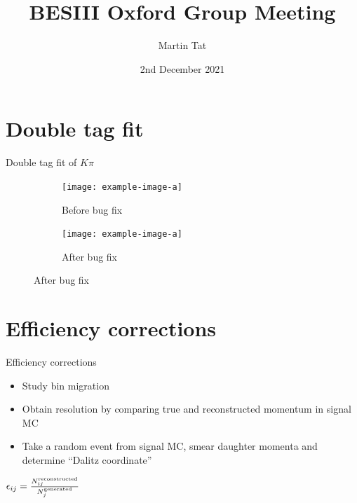\documentclass{beamer}
\title[BESIII Oxford]{BESIII Oxford Group Meeting}
\author{Martin Tat}
\institute{Oxford LHCb}
\date{2nd December 2021}
\begin{document}
\begin{frame}
  \titlepage
\end{frame}


\section{Double tag fit}

\begin{frame}{Double tag fit of $K\pi$}
  \begin{figure}
    \centering
    \begin{subfigure}{0.38\textwidth}
      \centering
      \texttt{[image: example-image-a]}
      \caption{Before bug fix}
    \end{subfigure}%
    \begin{subfigure}{0.38\textwidth}
      \centering
      \texttt{[image: example-image-a]}
      \caption{After bug fix}
    \end{subfigure}
  \end{figure}
\end{frame}

\section{Efficiency corrections}
\begin{frame}{Efficiency corrections}
  \begin{itemize}
    \setlength\itemsep{1.5em}
    \item{Study bin migration}
    \item{Obtain resolution by comparing true and reconstructed momentum in signal MC}
    \item{Take a random event from signal MC, smear daughter momenta and determine ``Dalitz coordinate''}
  \end{itemize}
  \vspace{0.3cm}
  \begin{center}
    $\epsilon_{ij} = \frac{N^{\rm reconstructed}_{ij}}{N^{\rm generated}_j}$
  \end{center}
\end{frame}
\end{document}
